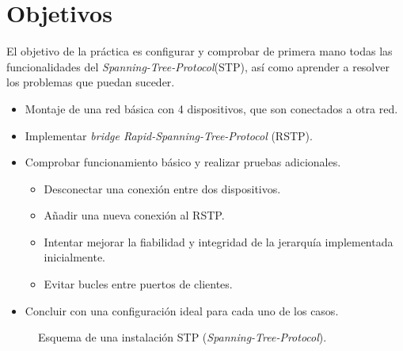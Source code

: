 
\chapter{Objetivos }

El objetivo de la práctica es configurar y comprobar de primera mano todas las funcionalidades del \textit{Spanning-Tree-Protocol}(STP), así como aprender a resolver los problemas que puedan suceder.
\begin{itemize}
	\item  Montaje de una red básica con 4 dispositivos, que son conectados a otra red.
	\item  Implementar \textit{bridge Rapid-Spanning-Tree-Protocol }(RSTP).
	\item  Comprobar funcionamiento básico y realizar pruebas adicionales.
	\begin{itemize}
		\item Desconectar una conexión entre dos dispositivos.
		\item Añadir una nueva conexión al RSTP.
		\item Intentar mejorar la fiabilidad y integridad de la jerarquía implementada inicialmente.
		\item Evitar bucles entre puertos de clientes.	
	\end{itemize}
	\item Concluir con una configuración ideal para cada uno de los casos.
\end{itemize}

\begin{figure}[h!]\centering
	\caption{Esquema de una instalación STP (\textit{Spanning-Tree-Protocol}).}
	\label{f21}
	\bigskip
\end{figure}